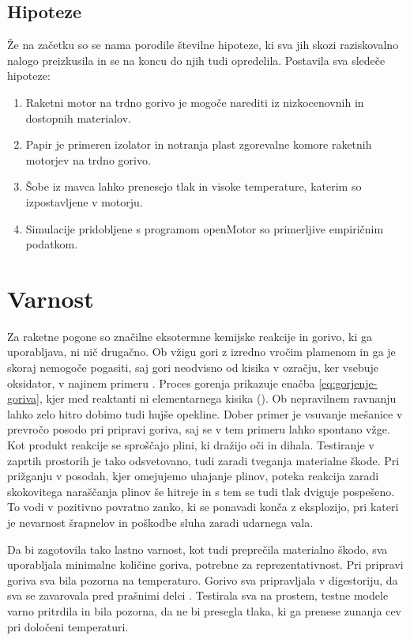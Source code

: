 \documentclass[titlepage, a4paper, twoside, final, 12pt]{article}
\begin{document}
		\subsection{Hipoteze}
		Že na začetku so se nama porodile številne hipoteze, ki sva jih skozi raziskovalno nalogo preizkusila in se na koncu do njih tudi opredelila.
		Postavila sva sledeče hipoteze:
		\begin{enumerate}
				\item Raketni motor na trdno gorivo je mogoče narediti iz nizkocenovnih in dostopnih materialov.
				\item Papir je primeren izolator in notranja plast zgorevalne komore raketnih motorjev na trdno gorivo.
				\item Šobe iz mavca lahko prenesejo tlak in visoke temperature, katerim so izpostavljene v motorju.
				\item Simulacije pridobljene s programom openMotor so primerljive empiričnim podatkom.
		\end{enumerate}

		\section{Varnost}
		Za raketne pogone so značilne eksotermne kemijske reakcije in gorivo, ki ga uporabljava, ni nič drugačno. Ob vžigu gori z izredno vročim plamenom in
		ga je skoraj nemogoče pogasiti, saj gori neodvisno od kisika v ozračju, ker vsebuje oksidator, v najinem primeru .
		Proces gorenja prikazuje enačba \ref{eq:gorjenje-goriva}, kjer med reaktanti ni elementarnega kisika ().
		Ob nepravilnem ravnanju lahko zelo hitro dobimo tudi hujše opekline. Dober primer je vsuvanje mešanice v prevročo posodo pri pripravi goriva, saj se v tem primeru lahko spontano vžge.
		Kot produkt reakcije se sproščajo plini, ki dražijo oči in dihala. Testiranje v zaprtih prostorih je tako odsvetovano, tudi zaradi tveganja materialne škode.
		Pri prižganju v posodah, kjer omejujemo uhajanje plinov, poteka reakcija zaradi skokovitega naraščanja plinov še hitreje in s tem se tudi tlak dviguje pospešeno.
		To vodi v pozitivno povratno zanko, ki se ponavadi konča z eksplozijo, pri kateri je nevarnost šrapnelov in poškodbe sluha zaradi udarnega vala.

		Da bi zagotovila tako lastno varnost, kot tudi preprečila materialno škodo, sva uporabljala minimalne količine goriva, potrebne za reprezentativnost. Pri pripravi goriva sva
		bila pozorna na temperaturo. Gorivo sva pripravljala v digestoriju, da sva se
		zavarovala pred prašnimi delci . Testirala sva na prostem, testne modele
		varno pritrdila in bila pozorna, da ne bi presegla tlaka, ki ga prenese zunanja cev pri določeni temperaturi.
		
\end{document}
